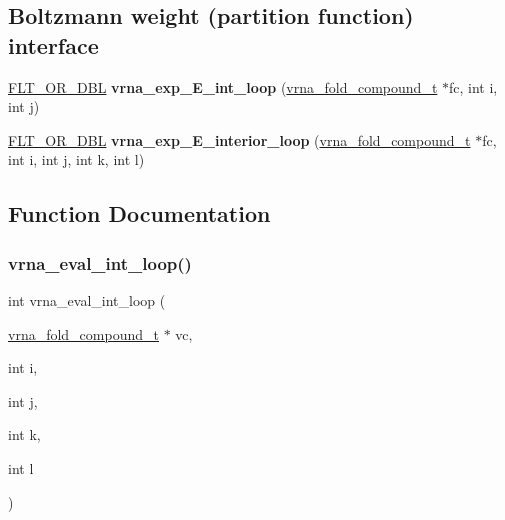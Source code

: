 \subsection*{Boltzmann weight (partition function) interface}
\begin{DoxyCompactItemize}
\item 
\mbox{\label{group__eval__loops__int_gaa64bb3e28f557985a4d448f8fd86a115}} 
\mbox{\hyperlink{group__data__structures_ga31125aeace516926bf7f251f759b6126}{F\+L\+T\+\_\+\+O\+R\+\_\+\+D\+BL}} {\bfseries vrna\+\_\+exp\+\_\+\+E\+\_\+int\+\_\+loop} (\mbox{\hyperlink{group__fold__compound_ga1b0cef17fd40466cef5968eaeeff6166}{vrna\+\_\+fold\+\_\+compound\+\_\+t}} $\ast$fc, int i, int j)
\item 
\mbox{\label{group__eval__loops__int_ga51130eaa2debd3bb8e52de7a3de048ad}} 
\mbox{\hyperlink{group__data__structures_ga31125aeace516926bf7f251f759b6126}{F\+L\+T\+\_\+\+O\+R\+\_\+\+D\+BL}} {\bfseries vrna\+\_\+exp\+\_\+\+E\+\_\+interior\+\_\+loop} (\mbox{\hyperlink{group__fold__compound_ga1b0cef17fd40466cef5968eaeeff6166}{vrna\+\_\+fold\+\_\+compound\+\_\+t}} $\ast$fc, int i, int j, int k, int l)
\end{DoxyCompactItemize}


\subsection{Function Documentation}
\mbox{\label{group__eval__loops__int_gaab3547bfcdc39d89babbc7ed2a1a4b65}} 
\subsubsection{\texorpdfstring{vrna\_eval\_int\_loop()}{vrna\_eval\_int\_loop()}}
{\footnotesize\ttfamily int vrna\+\_\+eval\+\_\+int\+\_\+loop (\begin{DoxyParamCaption}\item[{\mbox{\hyperlink{group__fold__compound_ga1b0cef17fd40466cef5968eaeeff6166}{vrna\+\_\+fold\+\_\+compound\+\_\+t}} $\ast$}]{vc,  }\item[{int}]{i,  }\item[{int}]{j,  }\item[{int}]{k,  }\item[{int}]{l }\end{DoxyParamCaption})}



